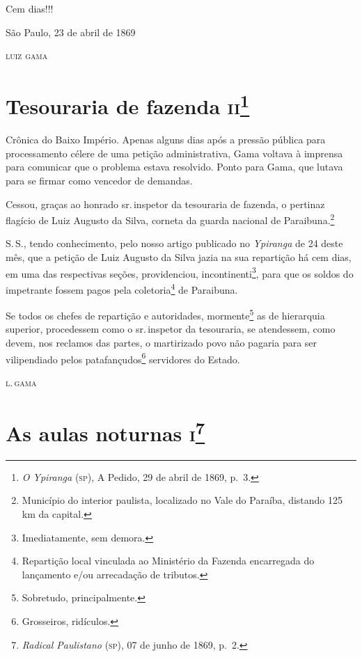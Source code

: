 Cem dias!!!

\begin{flushright}
São Paulo, 23 de abril de 1869

\textsc{luiz gama}
\end{flushright}

\chapter{Tesouraria de fazenda \textsc{ii}\footnote{\emph{O Ypiranga}
  (\textsc{sp}), A Pedido, 29 de abril de 1869, p.~3.}}

\begin{didascalia}
Crônica do Baixo Império. Apenas alguns dias após a pressão pública para
processamento célere de uma petição administrativa, Gama voltava à
imprensa para comunicar que o problema estava resolvido. Ponto para
Gama, que lutava para se firmar como vencedor de demandas.
\end{didascalia}


Cessou, graças ao honrado sr.\,inspetor da tesouraria de fazenda, o
pertinaz flagício de Luiz Augusto da Silva, corneta da guarda nacional
de Paraibuna.\footnote{Município do interior paulista, localizado no
  Vale do Paraíba, distando 125 km da capital.}

S.\,S., tendo conhecimento, pelo nosso artigo publicado no
\emph{Ypiranga} de 24 deste mês, que a petição de Luiz Augusto da Silva
jazia na sua repartição há cem dias, em uma das respectivas seções,
providenciou, incontinenti\footnote{Imediatamente, sem demora.}, para
que os soldos do impetrante fossem pagos pela coletoria\footnote{
  Repartição local vinculada ao Ministério da Fazenda encarregada do
  lançamento e/ou arrecadação de tributos.} de Paraibuna.

Se todos os chefes de repartição e autoridades, mormente\footnote{
  Sobretudo, principalmente.} as de hierarquia superior, procedessem
como o sr.\,inspetor da tesouraria, se atendessem, como devem, nos
reclamos das partes, o martirizado povo não pagaria para ser
vilipendiado pelos patafançudos\footnote{Grosseiros, ridículos.}
servidores do Estado.

\begin{flushright}
\textsc{l.\,gama}
\end{flushright}

\chapter{As aulas noturnas \textsc{i}\footnote{\emph{Radical Paulistano}
  (\textsc{sp}), 07 de junho de 1869, p.~2.}}

